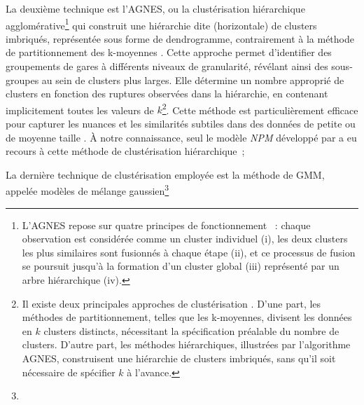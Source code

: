 \begin{refsegment}
\begin{customitemize}
    \item La deuxième technique est l'\acrfull{AGNES}, ou la clustérisation hiérarchique agglomérative\footnote{
        L'\acrfull{AGNES} repose sur quatre principes de fonctionnement \textcolor{blue}{\autocite[5]{barve_reef-insight_2023}}~: chaque observation est considérée comme un cluster individuel (i), les deux clusters les plus similaires sont fusionnés à chaque étape (ii), et ce processus de fusion se poursuit jusqu'à la formation d'un cluster global (iii) représenté par un arbre hiérarchique (iv).
    } qui construit une hiérarchie dite  (horizontale) de clusters imbriqués, représentée sous forme de dendrogramme, contrairement à la méthode de partitionnement des k-moyennes \textcolor{blue}{\autocite[199]{kaufman_finding_1990}}. Cette approche permet d'identifier des groupements de gares à différents niveaux de granularité, révélant ainsi des sous-groupes au sein de clusters plus larges. Elle détermine un nombre approprié de clusters en fonction des ruptures observées dans la hiérarchie, en contenant implicitement toutes les valeurs de \(k\)\footnote{
        Il existe deux principales approches de clustérisation \textcolor{blue}{\autocite[2]{struyf_clustering_1997}}. D'une part, les méthodes de partitionnement, telles que les k-moyennes, divisent les données en \(k\) clusters distincts, nécessitant la spécification préalable du nombre de clusters. D'autre part, les méthodes hiérarchiques, illustrées par l'algorithme \acrshort{AGNES}, construisent une hiérarchie de clusters imbriqués, sans qu'il soit nécessaire de spécifier \(k\) à l'avance.
    }. Cette méthode est particulièrement efficace pour capturer les nuances et les similarités subtiles dans des données de petite ou de moyenne taille \textcolor{blue}{\autocite[5]{barve_reef-insight_2023}}. À notre connaissance, seul le modèle \textsl{NPM} développé par \textcolor{blue}{\textcite[3]{olaru_place_2019}} a eu recours à cette méthode de clustérisation hiérarchique~;
    \item La dernière technique de clustérisation employée est la méthode de \acrfull{GMM}, appelée modèles de mélange gaussien\footnote{
}
\end{customitemize}
\end{refsegment}
